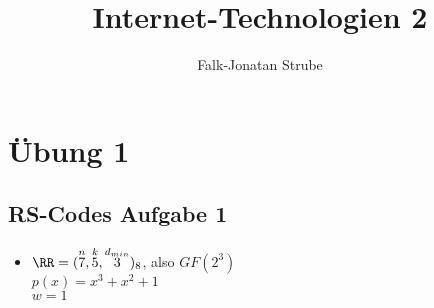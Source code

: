 \documentclass{scrreprt}
\title{Internet-Technologien 2}
\author{Falk-Jonatan Strube}
\begin{document}
\maketitle
\tableofcontents

\chapter{Übung 1}
\section{RS-Codes Aufgabe 1}
\begin{itemize}
\item $\RR = (\overset{n}{7}, \overset{k}{5}, \overset{d_{min}}{3})_8$, also $GF(2^3)$\\
$p(x)=x^3+x^2+1$\\
$w=1$
\end{itemize}
\end{document}
